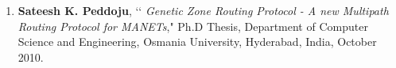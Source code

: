 \begin{enumerate}[label=(R\arabic*)]		
			\item
			\textbf{Sateesh K. Peddoju}, \lq\lq
			\emph{Genetic Zone Routing Protocol - A new Multipath Routing Protocol for MANETs}," Ph.D Thesis, Department of Computer Science and Engineering, Osmania University, Hyderabad, India, October 2010.
			
		\end{enumerate}
